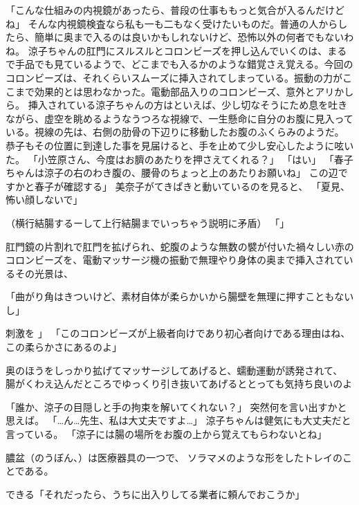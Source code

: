 「こんな仕組みの内視鏡があったら、普段の仕事ももっと気合が入るんだけどね」
そんな内視鏡検査なら私も一も二もなく受けたいものだ。普通の人からしたら、簡単に奥まで入るのは良いかもしれないけど、恐怖以外の何者でもないわね。
涼子ちゃんの肛門にスルスルとコロンビーズを押し込んでいくのは、まるで手品でも見ているようで、どこまでも入るかのような錯覚さえ覚える。今回のコロンビーズは、それくらいスムーズに挿入されてしまっている。振動の力がここまで効果的とは思わなかった。電動部品入りのコロンビーズ、意外とアリかしら。
挿入されている涼子ちゃんの方はといえば、少し切なそうにため息を吐きながら、虚空を眺めるようなうつろな視線で、一生懸命に自分のお腹に見入っている。視線の先は、右側の肋骨の下辺りに移動したお腹のふくらみのようだ。
恭子もその位置に到達した事を見届けると、手を止めて少し安心したように呟いた。
「小笠原さん、今度はお臍のあたりを押さえてくれる？」
「はい」
「春子ちゃんは涼子の右のわき腹の、腰骨のちょっと上のあたりお願いね」
この辺ですかと春子が確認する」
美奈子がてきぱきと動いているのを見ると、
「夏見、怖い顔しないで」


（横行結腸するーして上行結腸までいっちゃう説明に矛盾）
「」

肛門鏡の片割れで肛門を拡げられ、蛇腹のような無数の襞が付いた禍々しい赤のコロンビーズを、電動マッサージ機の振動で無理やり身体の奥まで挿入されているその光景は、



「曲がり角はきついけど、素材自体が柔らかいから腸壁を無理に押すこともないし」


刺激を
」
「このコロンビーズが上級者向けであり初心者向けである理由はね、この柔らかさにあるのよ」



奥のほうをしっかり拡げてマッサージしてあげると、蠕動運動が誘発されて、
腸がくわえ込んだところでゆっくり引き抜いてあげるととっても気持ち良いのよ








「誰か、涼子の目隠しと手の拘束を解いてくれない？」
突然何を言い出すかと思えば。
「…ん…先生、私は大丈夫ですよ…」
涼子ちゃんは健気にも大丈夫だと言っている。
「涼子には腸の場所をお腹の上から覚えてもらわないとね」





膿盆（のうぼん、）は医療器具の一つで、
ソラマメのような形をしたトレイのことである。


できる「それだったら、うちに出入りしてる業者に頼んでおこうか」




